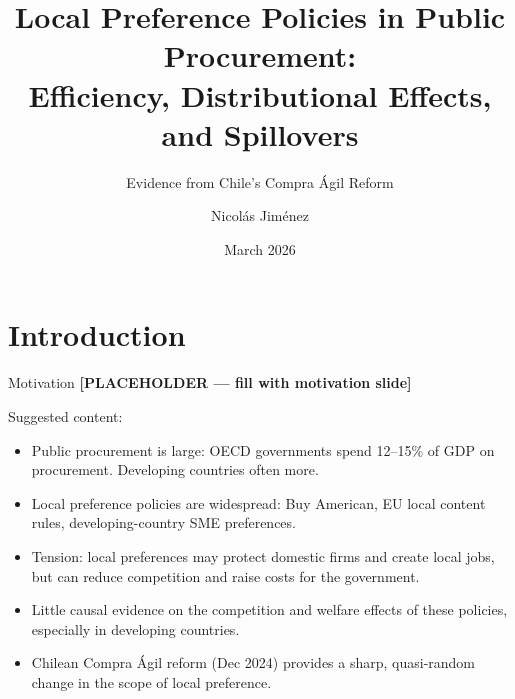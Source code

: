 \documentclass[9pt,aspectratio=169]{beamer}
\title{Local Preference Policies in Public Procurement:\\
       Efficiency, Distributional Effects, and Spillovers}
\subtitle{Evidence from Chile's Compra Ágil Reform}
\author{Nicolás Jiménez}
\date{March 2026}
\institute{Yale University}
\begin{document}
\maketitle

\section{Introduction}

\begin{frame}{Motivation}
\textbf{[PLACEHOLDER — fill with motivation slide]}

\medskip
Suggested content:
\begin{itemize}
  \item Public procurement is large: OECD governments spend 12--15\% of GDP
        on procurement. Developing countries often more.
  \item Local preference policies are widespread: Buy American, EU local content
        rules, developing-country SME preferences.
  \item Tension: local preferences may protect domestic firms and create local
        jobs, but can reduce competition and raise costs for the government.
  \item Little causal evidence on the competition and welfare effects of these
        policies, especially in developing countries.
  \item Chilean Compra Ágil reform (Dec 2024) provides a sharp, quasi-random
        change in the scope of local preference.
\end{itemize}
\end{frame}
\end{document}
